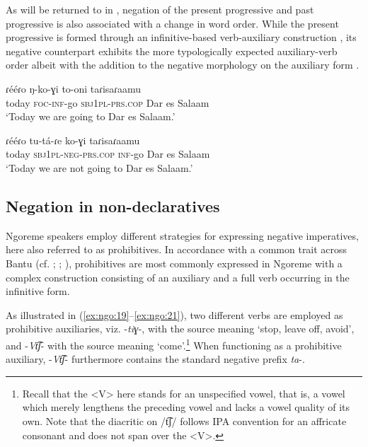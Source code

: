 \documentclass[output=paper,colorlinks,citecolor=brown,draftmode]{langscibook}
\begin{document}
As will be returned to in , negation of the present progressive and past progressive is also associated with a change in word order. While the present progressive is formed through an infinitive-based verb-auxiliary construction , its negative counterpart exhibits the more typologically expected auxiliary-verb order albeit with the addition to the negative morphology on the auxiliary form . 

\ea\label{ex:ngo:17}
    \gll ɾééɾo ŋ-ko-ɣi to-oni taɾisaɾaamu\\ 
        today \textsc{foc}{}-\textsc{inf}{}-go \textsc{sbj}1\textsc{pl}{}-\textsc{prs.cop} {Dar es Salaam}\\
    \glt ‘Today we are going to Dar es Salaam.’
\z 

\ea\label{ex:ngo:18} 
    \gll ɾééɾo tu-tá-ɾe ko-ɣi taɾisaɾaamu \\ 
        today \textsc{sbj}1\textsc{pl}{}-\textsc{neg-}\textsc{prs.cop} \textsc{inf}{}-go {Dar es Salaam}\\
    \glt ‘Today we are not going to Dar es Salaam.’
\z 



\subsection{Negation in non-declaratives}\label{sec:ngo:2.2}

Ngoreme speakers employ different strategies for expressing negative imperatives, here also referred to as prohibitives. In accordance with a common trait across Bantu (cf. \citealt{DevosVanOlmen2013}; \citealt[191--193]{Nurse2008}; \citealt{Güldemann1999}), prohibitives are most commonly expressed in Ngoreme with a complex construction consisting of an auxiliary and a full verb occurring in the infinitive form.


As illustrated in (\ref{ex:ngo:19}--\ref{ex:ngo:21}), two different verbs are employed as prohibitive auxiliaries, viz. -\textit{tiɣ}{}-, with the source meaning ‘stop, leave off, avoid’, and \nobreakdash-\textit{Vt͡ʃ}\nobreakdash- with the source meaning ‘come’.\footnote{Recall that the <V> here stands for an unspecified vowel, that is, a vowel which merely lengthens the preceding vowel and lacks a vowel quality of its own. Note that the diacritic on /t͡ʃ/ follows IPA convention for an affricate consonant and does not span over the <V>.} When functioning as a prohibitive auxiliary, \nobreakdash-\textit{Vt͡ʃ}- furthermore contains the standard negative prefix \textit{ta}{}-.
\end{document}
